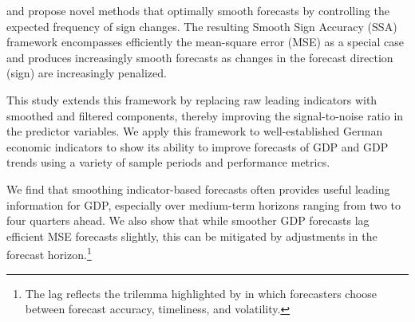 \documentclass[11pt,a4paper]{article}
\begin{document}
\cite{Wildi2024,Wildi2025} and \cite{McElroy2019,McElroy2020} propose novel methods that optimally smooth forecasts by controlling the expected frequency of sign changes. The resulting Smooth Sign Accuracy (SSA) framework encompasses efficiently the mean-square error (MSE) as a special case and produces increasingly smooth forecasts as changes in the forecast direction (sign) are increasingly penalized. 





This study extends this framework by replacing raw leading indicators with smoothed and filtered components, thereby improving the signal-to-noise ratio in the predictor variables. We apply this framework to well-established German economic indicators to show its ability to improve forecasts of GDP \citep{lehmann2021predicting,Heinisch2018bottom}  and GDP trends using a variety of sample periods and performance metrics. 

We find that smoothing indicator-based forecasts often provides useful leading information for GDP, especially over medium-term horizons ranging from two to four quarters ahead. We also show that while smoother GDP forecasts lag efficient MSE forecasts slightly, this can be mitigated by adjustments in the forecast horizon.\footnote{The lag reflects the trilemma highlighted by \cite{McElroy2019} in which forecasters choose between forecast accuracy, timeliness, and volatility.}
\end{document}
